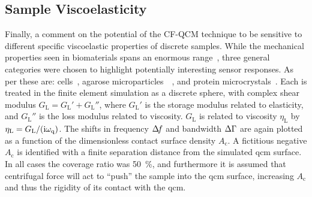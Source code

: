 \subsection{Sample Viscoelasticity}
\label{sec:sampleviscoelasticity}
Finally, a comment on the potential of the CF-QCM technique to be
sensitive to different specific viscoelastic properties of discrete samples.  While
the mechanical properties seen in biomaterials spans an enormous
range~\cite{meyers2008biological}, three general categories were chosen to
highlight potentially interesting sensor responses.  As per
 these are: cells~\cite{li2008thickness}, agarose
microparticles~\cite{li2011surface}~\cite{patra2009viscoelastic}, and
protein microcrystals~\cite{zamiri2009modeling}.  Each is treated in the
finite element simulation as a discrete sphere, with complex shear modulus
$G_\mathrm{L}=G_\mathrm{L}'+G_\mathrm{L}''$, where $G_\mathrm{L}'$ is the
storage modulus related to elasticity, and $G_\mathrm{L}''$ is the loss
modulus related to viscosity.  $G_\mathrm{L}$ is related to viscosity
$\eta_\mathrm{L}$ by $\eta_\mathrm{L}=G_\mathrm{L}/({\mathrm{i}}\omega_\mathrm{q})$.  The
shifts in frequency $\Delta\!f$ and bandwidth $\Delta\Gamma$ are again plotted as a function of
the dimensionless contact surface density $A_\mathrm{c}$.
A fictitious negative $A_\mathrm{c}$
is identified with a finite separation distance from the
simulated \gls{qcm} surface.  In all cases the coverage ratio was
\SI{50}{\percent}, and furthermore it is assumed that centrifugal force will act to
``push'' the sample into the \gls{qcm} surface, increasing $A_\mathrm{c}$ and
thus the rigidity of its contact with the \gls{qcm}.
